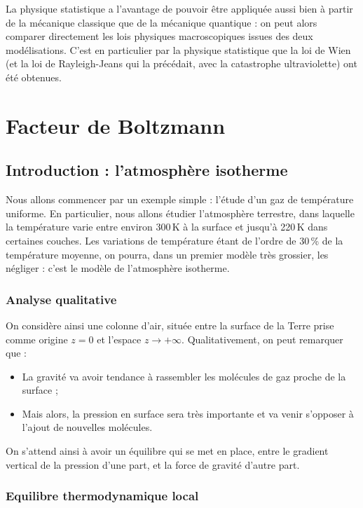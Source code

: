 \documentclass[11pt,fleqn]{book} %
\begin{document}
La physique statistique a l'avantage de pouvoir être appliquée aussi bien à partir de la mécanique classique que de la mécanique quantique : on peut alors comparer directement les lois physiques macroscopiques issues des deux modélisations. C'est en particulier par la physique statistique que la loi de Wien (et la loi de Rayleigh-Jeans qui la précédait, avec la catastrophe ultraviolette) ont été obtenues.

\section{Facteur de Boltzmann}

\subsection{Introduction : l'atmosphère isotherme}

Nous allons commencer par un exemple simple : l'étude d'un gaz de température uniforme. En particulier, nous allons étudier l'atmosphère terrestre, dans laquelle la température varie entre environ 300\,K à la surface et jusqu'à 220\,K dans certaines couches. Les variations de température étant de l'ordre de 30\,\% de la température moyenne, on pourra, dans un premier modèle très grossier, les négliger : c'est le modèle de l'atmosphère isotherme.

\subsubsection{Analyse qualitative}

On considère ainsi une colonne d'air, située entre la surface de la Terre prise comme origine $z=0$ et l'espace $z \to +\infty$. Qualitativement, on peut remarquer que :
\begin{itemize}
	\item La gravité va avoir tendance à rassembler les molécules de gaz proche de la surface ;
	\item Mais alors, la pression en surface sera très importante et va venir s'opposer à l'ajout de nouvelles molécules.
\end{itemize}
On s'attend ainsi à avoir un équilibre qui se met en place, entre le gradient vertical de la pression d'une part, et la force de gravité d'autre part.

\subsubsection{Equilibre thermodynamique local}
\end{document}
